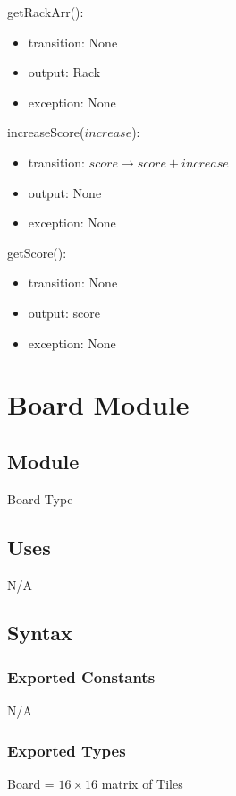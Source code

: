 \documentclass[12pt]{article}
\begin{document}
\noindent getRackArr():
\begin{itemize}
\item transition: None
\item output: Rack
\item exception: None
\end{itemize}

\noindent increaseScore($increase$):
\begin{itemize}
\item transition: $score \rightarrow score+increase$
\item output: None
\item exception: None
\end{itemize}

\noindent getScore():
\begin{itemize}
\item transition: None
\item output: score
\item exception: None
\end{itemize}

\newpage

\section* {Board Module}

\subsection*{Module}

Board Type

\subsection* {Uses}

N/A

\subsection* {Syntax}

\subsubsection* {Exported Constants}
N/A
\subsubsection* {Exported Types}

Board = $16 \times 16$ matrix of Tiles
\end{document}

